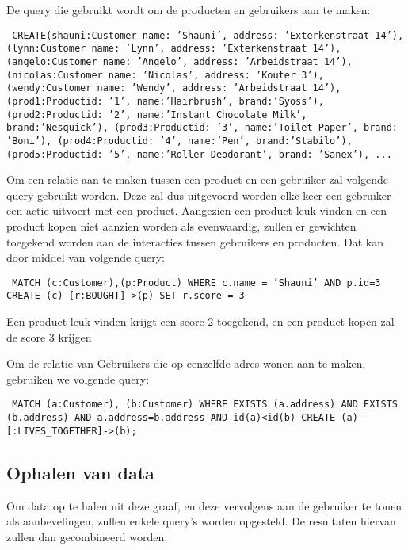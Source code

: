 De query die gebruikt wordt om de producten en gebruikers aan te maken:

\texttt{
CREATE(shauni:Customer {name: 'Shauni', address: 'Exterkenstraat 14'}), \newline
(lynn:Customer {name: 'Lynn', address: 'Exterkenstraat 14'}), \newline
(angelo:Customer {name: 'Angelo', address: 'Arbeidstraat 14'}), \newline
(nicolas:Customer {name: 'Nicolas', address: 'Kouter 3'}), \newline
(wendy:Customer {name: 'Wendy', address: 'Arbeidstraat 14'}), \newline
(prod1:Product{id: '1', name:'Hairbrush', brand:'Syoss'}), \newline
(prod2:Product{id: '2', name:'Instant Chocolate Milk', brand:'Nesquick'}), \newline
(prod3:Product{id: '3', name:'Toilet Paper', brand: 'Boni'}), \newline
(prod4:Product{id: '4', name:'Pen', brand:'Stabilo'}), \newline
(prod5:Product{id: '5', name:'Roller Deodorant', brand: 'Sanex'}), \newline
...
}

Om een relatie aan te maken tussen een product en een gebruiker zal volgende query gebruikt worden. Deze zal dus uitgevoerd worden elke keer een gebruiker een actie uitvoert met een product.
Aangezien een product leuk vinden en een product kopen niet aanzien worden als evenwaardig, zullen er gewichten toegekend worden aan de interacties tussen gebruikers en producten.  Dat kan door middel van volgende query:


\texttt{
	MATCH (c:Customer),(p:Product) \newline
	WHERE c.name = 'Shauni' AND p.id=3 \newline
	CREATE (c)-[r:BOUGHT]->(p) \newline
	SET r.score = 3
}

Een product leuk vinden krijgt een score 2 toegekend, en een product kopen zal de score 3 krijgen

Om de relatie van Gebruikers die op eenzelfde adres wonen aan te maken, gebruiken we volgende query: 

\texttt{
MATCH (a:Customer), (b:Customer) \newline
WHERE EXISTS (a.address) AND EXISTS (b.address) AND a.address=b.address AND id(a)<id(b) \newline
CREATE (a)-[:LIVES\_TOGETHER]->(b); \newline
}

\subsection{Ophalen van data}
\label{sec:Ophalen van data}

Om data op te halen uit deze graaf, en deze vervolgens aan de gebruiker te tonen als aanbevelingen, zullen enkele query's worden opgesteld. De resultaten hiervan zullen dan gecombineerd worden. 










